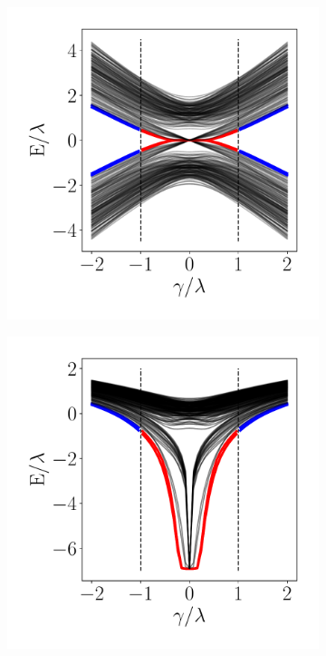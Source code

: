 \begin{figure}[h!]
      \begin{minipage}[h!]{0.9\textwidth}
         \begin{subfigure}[b!]{0.3 \textwidth}
             \caption{}
             \includegraphics[width=\textwidth]{Imagenes/Resultados_Hoti_Fractal/bands_square_shh_0.5.pdf}
             \label{}
         \end{subfigure}\hspace*{-0.5em}
         \begin{subfigure}[b!]{0.3 \textwidth}
             \caption{}
             \includegraphics[width=\textwidth]{Imagenes/Resultados_Hoti_Fractal/bands_square_shh_log0.5.pdf}

\end{subfigure}
\end{minipage}
\end{figure}
